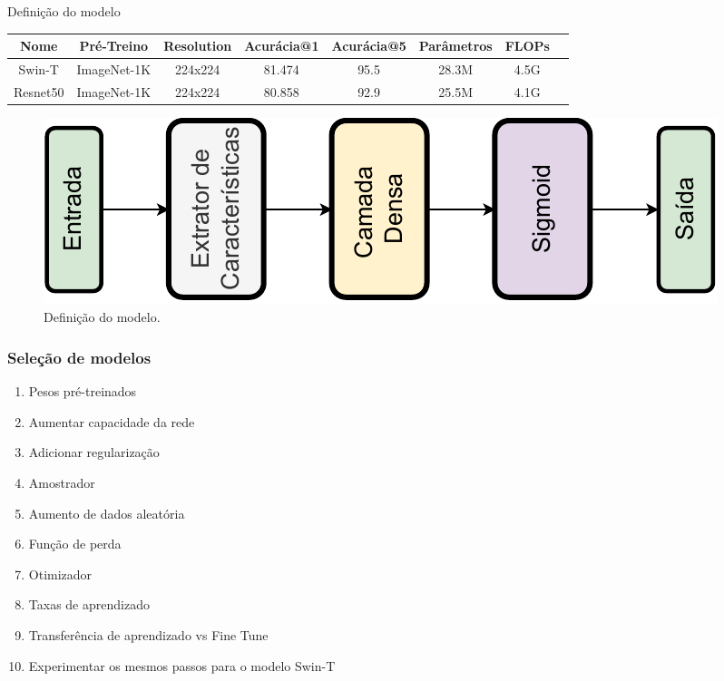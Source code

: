 \documentclass[8pt]{beamer}
\begin{document}
\begin{frame}{Definição do modelo}

\centering
\fontsize{6pt}{7pt}\selectfont
\begin{tabular}{*{8}{c}}
    \hline
    Nome & Pré-Treino & Resolution & Acurácia@1 & Acurácia@5 &  Parâmetros & FLOPs \\
    \hline
    Swin-T & ImageNet-1K & 224x224 & 81.474 & 95.5 &	28.3M &	4.5G \\
    Resnet50 & ImageNet-1K & 224x224 &	80.858 & 92.9 &	25.5M &	4.1G \\
    \hline
\end{tabular}

\begin{figure}[!ht]
    \centering
    \includegraphics[width=0.7\columnwidth]{Imagens/diagrama camadas modelo.pdf}

    \caption{ Definição do modelo.}

\end{figure}  
\end{frame}


\begin{frame}
\frametitle{Seleção de modelos}
\begin{enumerate}
    \item Pesos pré-treinados
    \item Aumentar capacidade da rede
    \item Adicionar regularização 
    \item Amostrador
    \item Aumento de dados aleatória
    \item Função de perda
    \item Otimizador
    \item Taxas de aprendizado
    \item Transferência de aprendizado vs Fine Tune
    \item Experimentar os mesmos passos para o modelo Swin-T
\end{enumerate}
\end{frame}
\end{document}
